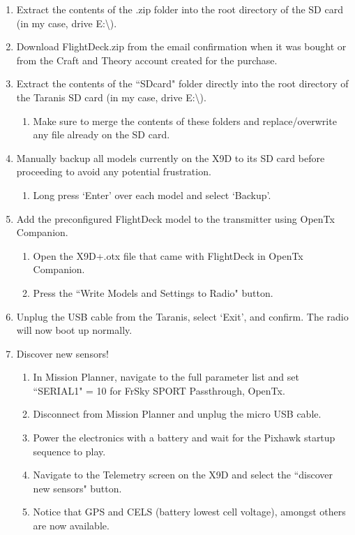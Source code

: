 \documentclass[12pt,journal,compsoc]{IEEEtran}
\begin{document}
\begin{enumerate}
\item Extract the contents of the .zip folder into the root directory of the SD card (in my case, drive E:\textbackslash).
\item Download FlightDeck.zip from the email confirmation when it was bought or from the Craft and Theory account created for the purchase.
\item Extract the contents of the ``SDcard" folder directly into the root directory of the Taranis SD card (in my case, drive E:\textbackslash).
\begin{enumerate}
\item Make sure to merge the contents of these folders and replace/overwrite any file already on the SD card.
\end{enumerate}
\item Manually backup all models currently on the X9D to its SD card before proceeding to avoid any potential frustration.
\begin{enumerate}
\item Long press `Enter' over each model and select `Backup'.
\end{enumerate}
\item Add the preconfigured FlightDeck model to the transmitter using OpenTx Companion.
\begin{enumerate}
\item Open the X9D+.otx file that came with FlightDeck in OpenTx Companion.
\item Press the ``Write Models and Settings to Radio" button.
\end{enumerate}
\item Unplug the USB cable from the Taranis, select `Exit', and confirm. The radio will now boot up normally.
\item Discover new sensors!
\begin{enumerate}
\item In Mission Planner, navigate to the full parameter list and set ``SERIAL1" = 10 for FrSky SPORT Passthrough, OpenTx.
\item Disconnect from Mission Planner and unplug the micro USB cable.
\item Power the electronics with a battery and wait for the Pixhawk startup sequence to play.
\item Navigate to the Telemetry screen on the X9D and select the ``discover new sensors" button.
\item Notice that GPS and CELS (battery lowest cell voltage), amongst others are now available.
\end{enumerate}
\end{enumerate}
\end{document}
